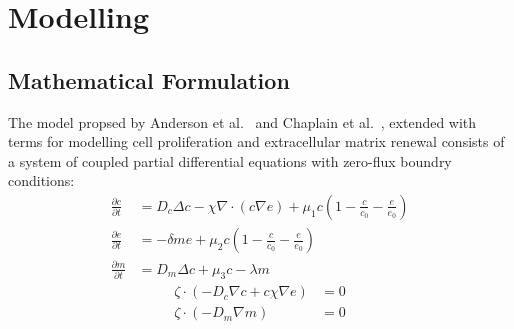 \section{Modelling}

\subsection{Mathematical Formulation}

The model propsed by Anderson et al.~\cite{anderson_continuous_1998,anderson_mathematical_2000} and Chaplain et al.~\cite{anderson_continuous_1998,chaplain_mathematical_2006-1,franssen_mathematical_2019}, extended with terms for modelling cell proliferation and extracellular matrix renewal consists of a system of coupled partial differential equations with zero-flux boundry conditions: 
\begin{align}
	\frac{\partial c}{\partial t} &= D_c \Delta c - \chi \nabla \cdot (c\nabla e)  + \mu_1 c\left(1-\frac{c}{c_0}-\frac{e}{e_0}\right)\label{eq1}\\
	\frac{\partial e}{\partial t} &= -\delta m e  + \mu_2 c\left(1-\frac{c}{c_0}-\frac{e}{e_0}\right)\label{eq2}\\
	\frac{\partial m}{\partial t} &= D_m \Delta c + \mu_3 c - \lambda m\label{eq3}
\end{align}
\begin{align}
	\zeta \cdot  (-D_c \nabla c + c \chi\nabla e) &= 0 \label{eq4}\\
	\zeta \cdot (-D_m\nabla m ) &= 0\label{eq5}
\end{align}

